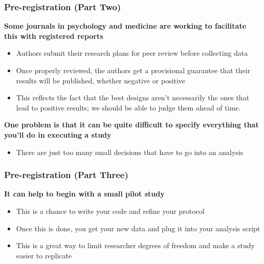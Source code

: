 \documentclass[10pt, block=fill]{beamer}
\begin{document}
\begin{frame}
    \frametitle{Pre-registration (Part Two)}
    
    \textbf{Some journals in psychology and medicine are working to facilitate this with registered reports}
    \begin{itemize}
        \item Authors submit their research plans for peer review before collecting data
        \item Once properly reviewed, the authors get a provisional guarantee that their results will be published, whether negative or positive
        \item This reflects the fact that the best designs aren't necessarily the ones that lead to positive results; we should be able to judge them ahead of time.
    \end{itemize}
    
    \vspace{0.2in}
    
    \textbf{One problem is that it can be quite difficult to specify everything that you'll do in executing a study}
    \begin{itemize}
        \item There are just too many small decisions that have to go into an analysis
    \end{itemize}
\end{frame}


\begin{frame}
    \frametitle{Pre-registration (Part Three)}
    
    \textbf{It can help to begin with a small pilot study}
    \begin{itemize}
        \item This is a chance to write your code and refine your protocol
        \item Once this is done, you get your new data and plug it into your analysis script
        \item This is a great way to limit researcher degrees of freedom and make a study easier to replicate
    \end{itemize}
\end{frame}
\end{document}
